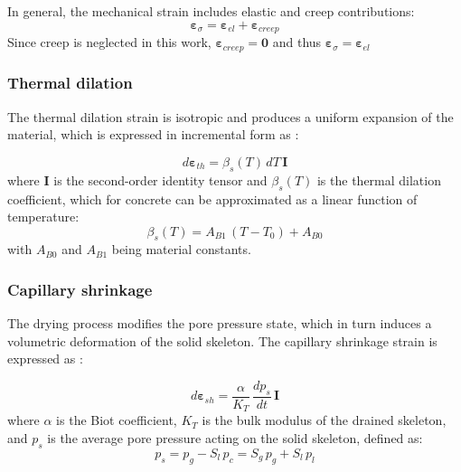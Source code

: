 In general, the mechanical strain includes elastic and creep contributions:
\begin{equation}
    \boldsymbol{\varepsilon}_\sigma = \boldsymbol{\varepsilon}_{el} + \boldsymbol{\varepsilon}_{creep}
    \label{eq:eps_sigma_decomp}
\end{equation}
Since creep is neglected in this work, $\boldsymbol{\varepsilon}_{creep} = \mathbf{0}$ and thus $\boldsymbol{\varepsilon}_\sigma = \boldsymbol{\varepsilon}_{el}$ 

\subsubsection{Thermal dilation}

The thermal dilation strain is isotropic and produces a uniform expansion of the material, which is expressed in incremental form as \cite{dauti2018}:

\begin{equation}
    d\boldsymbol{\varepsilon}_{th} = 
    \beta_s(T)\,dT\,\mathbf{I}
    \label{eq:eps_th}
\end{equation}
where $\mathbf{I}$ is the second-order identity tensor and $\beta_s(T)$ is the thermal dilation coefficient, which for concrete can be approximated as a linear function of temperature:
\begin{equation}
    \beta_s(T) = A_{B1}\,(T - T_0) + A_{B0}
    \label{eq:beta_s}
\end{equation}
with $A_{B0}$ and $A_{B1}$ being material constants.

\subsubsection{Capillary shrinkage}

The drying process modifies the pore pressure state, which in turn induces a volumetric deformation of the solid skeleton. The capillary shrinkage strain is expressed as \cite{dauti2018}:

\begin{equation}
    d\boldsymbol{\varepsilon}_{sh} = 
    \frac{\alpha}{K_T}\,\frac{d p_s}{d t}\,\mathbf{I}
    \label{eq:eps_sh}
\end{equation}
where $\alpha$ is the Biot coefficient, $K_T$ is the bulk modulus of the drained skeleton, and $p_s$ is the average pore pressure acting on the solid skeleton, defined as:
\begin{equation}
    p_s = p_g - S_l\,p_c = S_g\,p_g + S_l\,p_l
    \label{eq:ps_shrinkage}
\end{equation}

